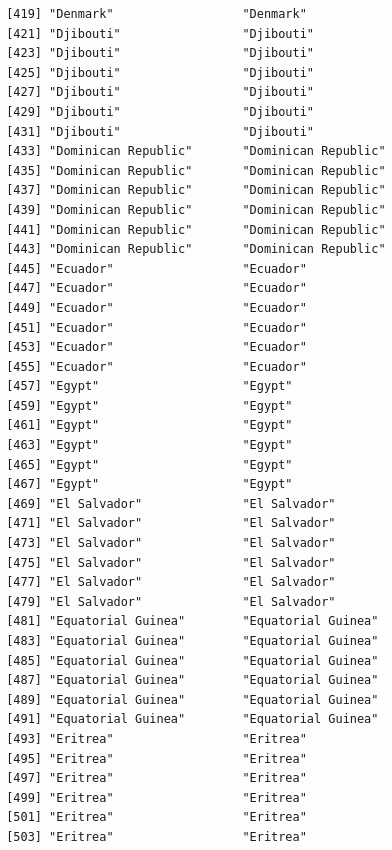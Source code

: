 \documentclass[
  letterpaper,
  DIV=11,
  numbers=noendperiod]{scrreprt}
\begin{document}
\begin{verbatim}
 [419] "Denmark"                  "Denmark"                 
 [421] "Djibouti"                 "Djibouti"                
 [423] "Djibouti"                 "Djibouti"                
 [425] "Djibouti"                 "Djibouti"                
 [427] "Djibouti"                 "Djibouti"                
 [429] "Djibouti"                 "Djibouti"                
 [431] "Djibouti"                 "Djibouti"                
 [433] "Dominican Republic"       "Dominican Republic"      
 [435] "Dominican Republic"       "Dominican Republic"      
 [437] "Dominican Republic"       "Dominican Republic"      
 [439] "Dominican Republic"       "Dominican Republic"      
 [441] "Dominican Republic"       "Dominican Republic"      
 [443] "Dominican Republic"       "Dominican Republic"      
 [445] "Ecuador"                  "Ecuador"                 
 [447] "Ecuador"                  "Ecuador"                 
 [449] "Ecuador"                  "Ecuador"                 
 [451] "Ecuador"                  "Ecuador"                 
 [453] "Ecuador"                  "Ecuador"                 
 [455] "Ecuador"                  "Ecuador"                 
 [457] "Egypt"                    "Egypt"                   
 [459] "Egypt"                    "Egypt"                   
 [461] "Egypt"                    "Egypt"                   
 [463] "Egypt"                    "Egypt"                   
 [465] "Egypt"                    "Egypt"                   
 [467] "Egypt"                    "Egypt"                   
 [469] "El Salvador"              "El Salvador"             
 [471] "El Salvador"              "El Salvador"             
 [473] "El Salvador"              "El Salvador"             
 [475] "El Salvador"              "El Salvador"             
 [477] "El Salvador"              "El Salvador"             
 [479] "El Salvador"              "El Salvador"             
 [481] "Equatorial Guinea"        "Equatorial Guinea"       
 [483] "Equatorial Guinea"        "Equatorial Guinea"       
 [485] "Equatorial Guinea"        "Equatorial Guinea"       
 [487] "Equatorial Guinea"        "Equatorial Guinea"       
 [489] "Equatorial Guinea"        "Equatorial Guinea"       
 [491] "Equatorial Guinea"        "Equatorial Guinea"       
 [493] "Eritrea"                  "Eritrea"                 
 [495] "Eritrea"                  "Eritrea"                 
 [497] "Eritrea"                  "Eritrea"                 
 [499] "Eritrea"                  "Eritrea"                 
 [501] "Eritrea"                  "Eritrea"                 
 [503] "Eritrea"                  "Eritrea"                 

\end{verbatim}
\end{document}
